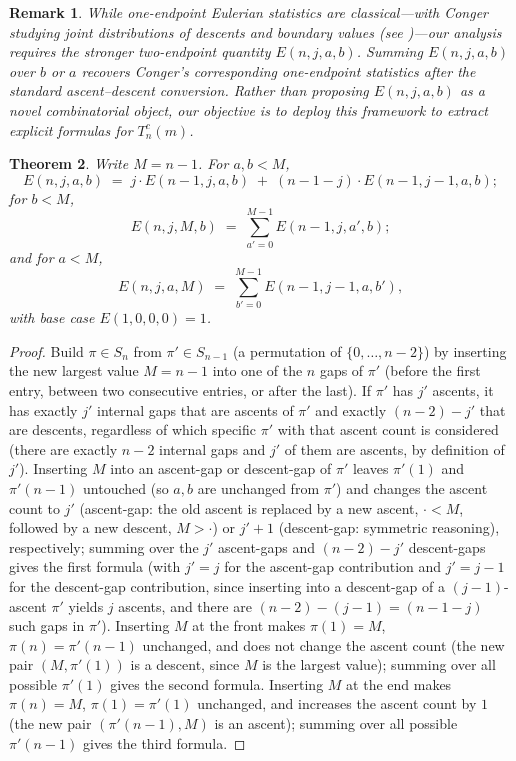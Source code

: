 \documentclass[11pt,a4paper]{amsart}
\newtheorem{theorem}{Theorem}[section]
\newtheorem{remark}[theorem]{Remark}
\newcommand{\1}{\mathbf{1}}
\begin{document}
\begin{remark}\label{rem:refined-eulerian}
While one-endpoint Eulerian statistics are classical—with Conger~\cite{Conger2010} studying joint distributions of descents and boundary values (see \cite[Eqs.~(2), (8), and Thm.~1]{Conger2010})—our analysis requires the stronger two-endpoint quantity $E(n,j,a,b)$. Summing $E(n,j,a,b)$ over $b$ or $a$ recovers Conger's corresponding one-endpoint statistics after the standard ascent--descent conversion. Rather than proposing $E(n,j,a,b)$ as a novel combinatorial object, our objective is to deploy this framework to extract explicit formulas for $T_n^c(m)$.
\end{remark}
\begin{theorem}\label{thm:E-recursion}
Write $M=n-1$. For $a,b<M$,
\[
E(n,j,a,b) \;=\; j\cdot E(n{-}1,j,a,b) \;+\; (n{-}1{-}j)\cdot E(n{-}1,j{-}1,a,b);
\]
for $b<M$,
\[
E(n,j,M,b) \;=\; \sum_{a'=0}^{M-1} E(n{-}1,j,a',b);
\]
and for $a<M$,
\[
E(n,j,a,M) \;=\; \sum_{b'=0}^{M-1} E(n{-}1,j{-}1,a,b'),
\]
with base case $E(1,0,0,0)=1$.
\end{theorem}
\begin{proof}
Build $\pi\in S_n$ from $\pi'\in S_{n-1}$ (a permutation of $\{0,\dots,n-2\}$) by inserting the new largest value $M=n-1$ into one of the $n$ gaps of $\pi'$ (before the first entry, between two consecutive entries, or after the last). If $\pi'$ has $j'$ ascents, it has exactly $j'$ internal gaps that are ascents of $\pi'$ and exactly $(n-2)-j'$ that are descents, regardless of which specific $\pi'$ with that ascent count is considered (there are exactly $n-2$ internal gaps and $j'$ of them are ascents, by definition of $j'$). Inserting $M$ into an ascent-gap or descent-gap of $\pi'$ leaves $\pi'(1)$ and $\pi'(n{-}1)$ untouched (so $a,b$ are unchanged from $\pi'$) and changes the ascent count to $j'$ (ascent-gap: the old ascent is replaced by a new ascent, $\cdot<M$, followed by a new descent, $M>\cdot$) or $j'+1$ (descent-gap: symmetric reasoning), respectively; summing over the $j'$ ascent-gaps and $(n-2)-j'$ descent-gaps gives the first formula (with $j'=j$ for the ascent-gap contribution and $j'=j-1$ for the descent-gap contribution, since inserting into a descent-gap of a $(j-1)$-ascent $\pi'$ yields $j$ ascents, and there are $(n-2)-(j-1)=(n-1-j)$ such gaps in $\pi'$). Inserting $M$ at the front makes $\pi(1)=M$, $\pi(n)=\pi'(n{-}1)$ unchanged, and does not change the ascent count (the new pair $(M,\pi'(1))$ is a descent, since $M$ is the largest value); summing over all possible $\pi'(1)$ gives the second formula. Inserting $M$ at the end makes $\pi(n)=M$, $\pi(1)=\pi'(1)$ unchanged, and increases the ascent count by $1$ (the new pair $(\pi'(n{-}1),M)$ is an ascent); summing over all possible $\pi'(n{-}1)$ gives the third formula.
\end{proof}
\end{document}

